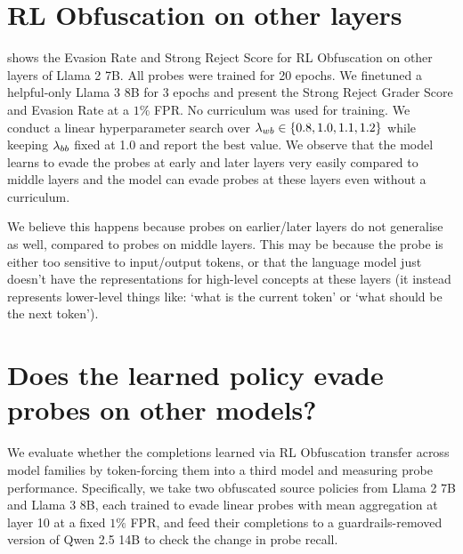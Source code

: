 \section{RL Obfuscation on other layers}
 shows the Evasion Rate and Strong Reject Score for RL Obfuscation on other layers of Llama 2 7B. All probes were trained for 20 epochs. We finetuned a helpful-only Llama 3 8B for 3 epochs and present the Strong Reject Grader Score and Evasion Rate at a $1\%$ FPR. No curriculum was used for training. We conduct a linear hyperparameter search over $\lambda_{wb} \in \{0.8, 1.0, 1.1, 1.2\}$ while keeping $\lambda_{bb}$ fixed at 1.0 and report the best value. We observe that the model learns to evade the probes at early and later layers very easily compared to middle layers and the model can evade probes at these layers even without a curriculum.
\vspace{-4pt}
\begin{table}[h]
    \centering
    
    \vspace{-8pt}
    \caption{RL Obfuscation on other layers of Llama 3 8B. We observe that the model learns to evade the probes at early and later layers very easily compared to middle layers.\vspace{-12pt}}
    \label{tab:other_layers}
\end{table}

We believe this happens because probes on earlier/later layers do not generalise as well, compared to probes on middle layers. This may be because the probe is either too sensitive to input/output tokens, or that the language model just doesn't have the representations for high-level concepts at these layers (it instead represents lower-level things like: `what is the current token' or `what should be the next token').
\vspace{-8pt}
\section{Does the learned policy evade probes on other models?}
\vspace{-4pt}
We evaluate whether the completions learned via RL Obfuscation transfer across model families by token-forcing them into a third model and measuring probe performance. Specifically, we take two obfuscated source policies from Llama 2 7B and Llama 3 8B, each trained to evade linear probes with mean aggregation at layer 10 at a fixed $1\%$ FPR, and feed their completions to a guardrails-removed version of Qwen 2.5 14B to check the change in probe recall.

